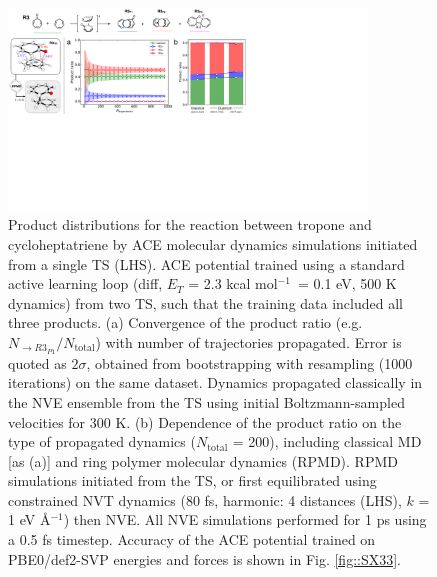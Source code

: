 \documentclass[twoside,twocolumn,9pt]{article}
\newcommand{\kcal}{kcal mol$^{-1}$}
\begin{document}
\begin{figure}[b]
	\centering
	\includegraphics[width=0.85\textwidth]{figX2}
	\caption{Product distributions for the reaction between tropone and cycloheptatriene by ACE molecular dynamics simulations initiated from a single TS (LHS). ACE potential trained using a standard active learning loop (diff, $E_T$ = 2.3 \kcal~= 0.1 eV, 500 K dynamics) from two TS, such that the training data included all three products. (a) Convergence of the product ratio (e.g. $N_{\rightarrow R3_{P1}} / N_\text{total}$) with number of trajectories propagated. Error is quoted as $2\sigma$, obtained from bootstrapping with resampling (1000 iterations) on the same dataset. Dynamics propagated classically in the NVE ensemble from the TS using initial Boltzmann-sampled velocities for 300 K. (b) Dependence of the product ratio on the type of propagated dynamics ($N_\text{total}$ = 200), including classical MD [as (a)] and ring polymer molecular dynamics (RPMD). RPMD simulations initiated from the TS, or first equilibrated using constrained NVT dynamics (80 fs, harmonic: 4 distances (LHS), $k$ = 1 eV \AA${}^{-1}$) then NVE. All NVE simulations performed for 1 ps using a 0.5 fs timestep. Accuracy of the ACE potential trained on PBE0/def2-SVP energies and forces is shown in Fig. \ref{fig::SX33}.}
	\label{fig::X2}
\end{figure}
\end{document}
